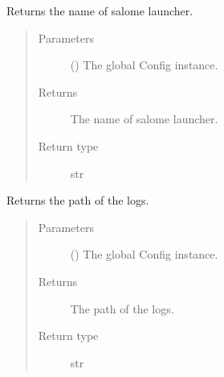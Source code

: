 \documentclass[a4paper,10pt,english]{sphinxmanual}
\begin{document}

\begin{fulllineitems}
\label{\detokenize{commands/apidoc/src:src.get_launcher_name}}
Returns the name of salome launcher.
\begin{quote}\begin{description}
\item[{Parameters}] \leavevmode
{} () \textendash{} The global Config instance.

\item[{Returns}] \leavevmode
The name of salome launcher.

\item[{Return type}] \leavevmode
str

\end{description}\end{quote}

\end{fulllineitems}


\begin{fulllineitems}
\label{\detokenize{commands/apidoc/src:src.get_log_path}}
Returns the path of the logs.
\begin{quote}\begin{description}
\item[{Parameters}] \leavevmode
{} () \textendash{} The global Config instance.

\item[{Returns}] \leavevmode
The path of the logs.

\item[{Return type}] \leavevmode
str

\end{description}\end{quote}

\end{fulllineitems}

\end{document}
